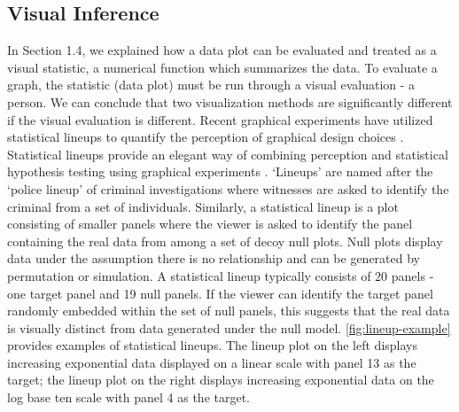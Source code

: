 \documentclass[12pt]{article}
\begin{document}
\hypertarget{visual-inference}{%
\subsection{Visual Inference}\label{visual-inference}}

In Section 1.4, we explained how a data plot can be evaluated and
treated as a visual statistic, a numerical function which summarizes the
data. To evaluate a graph, the statistic (data plot) must be run through
a visual evaluation - a person. We can conclude that two visualization
methods are significantly different if the visual evaluation is
different. Recent graphical experiments have utilized statistical
lineups to quantify the perception of graphical design choices
\citep{hofmann_graphical_2012, loy_model_2017, loy_variations_2016, vanderplas_clusters_2017}.
Statistical lineups provide an elegant way of combining perception and
statistical hypothesis testing using graphical experiments
\citep{majumder_validation_2013, vanderplas_testing_2020, wickham2010graphical}.
`Lineups' are named after the `police lineup' of criminal investigations
where witnesses are asked to identify the criminal from a set of
individuals. Similarly, a statistical lineup is a plot consisting of
smaller panels where the viewer is asked to identify the panel
containing the real data from among a set of decoy null plots. Null
plots display data under the assumption there is no relationship and can
be generated by permutation or simulation. A statistical lineup
typically consists of 20 panels - one target panel and 19 null panels.
If the viewer can identify the target panel randomly embedded within the
set of null panels, this suggests that the real data is visually
distinct from data generated under the null model.
\cref{fig:lineup-example} provides examples of statistical lineups. The
lineup plot on the left displays increasing exponential data displayed
on a linear scale with panel 13 as the target; the lineup plot on the
right displays increasing exponential data on the log base ten scale
with panel 4 as the target.
\end{document}
